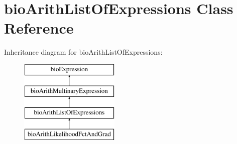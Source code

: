 \hypertarget{classbio_arith_list_of_expressions}{}\section{bio\+Arith\+List\+Of\+Expressions Class Reference}
\label{classbio_arith_list_of_expressions}
Inheritance diagram for bio\+Arith\+List\+Of\+Expressions\+:\begin{figure}[H]
\begin{center}
\leavevmode
\includegraphics[height=4.000000cm]{classbio_arith_list_of_expressions}
\end{center}
\end{figure}
